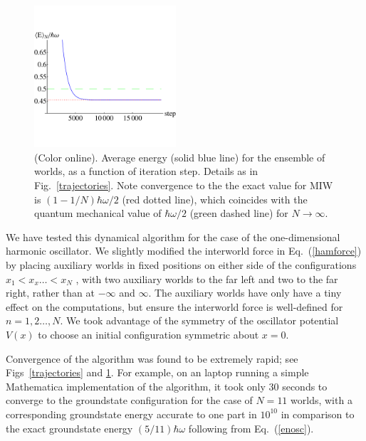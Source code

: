 \documentclass[12pt, aps,pra,amsmath,amssymb,superscriptaddress]{revtex4-2}
\renewcommand{\(}{\left(}
\renewcommand{\)}{\right)}
\newcommand{\blk}{\color{black}}
\begin{document}
    \begin{figure}[!t]
	\includegraphics[width=0.47\textwidth]{groundstate-energy.pdf}
    \caption{\label{algorithm} (Color online).
 Average energy (solid blue line) for the ensemble of worlds, 
 as a function of iteration step. Details as in Fig.~\ref{trajectories}. 
       Note convergence to the the exact value for MIW is
        $(1-1/N)\hbar\omega/2$ (red \blk dotted line),  which coincides with 
        the quantum mechanical value of $\hbar\omega/2$ (green \blk dashed line) for $N\to \infty$.\blk}
\end{figure}

We have tested this dynamical algorithm \blk for the case of the one-dimensional
harmonic oscillator.  We slightly \blk modified \blk the interworld force in Eq.~(\ref{hamforce}) by
placing auxiliary worlds in fixed positions on either side of the configurations
$x_1<x_x\dots <x_N$ , with two auxiliary worlds to the far left and two to the
far right, rather than at $-\infty$ and $\infty$.  The auxiliary worlds have
only have a tiny effect on the computations, but ensure the interworld force is
well-defined for $n=1,2\dots,N$.   We took advantage of the symmetry of the
oscillator potential $V(x)$ to choose an initial configuration symmetric about
$x=0$.

Convergence of the algorithm was found to be extremely rapid; see 
Figs~\ref{trajectories} and \ref{algorithm}. \blk  For example, on
an laptop running a simple Mathematica implementation of the algorithm, it took
only 30 seconds to converge to the groundstate configuration for the case of
$N=11$ worlds,  with a corresponding groundstate energy accurate to one part in
 $10^{10}$ \blk in comparison to the exact groundstate energy $(5/11)\hbar\omega$
following from Eq.~(\ref{enosc}).  
\end{document}
